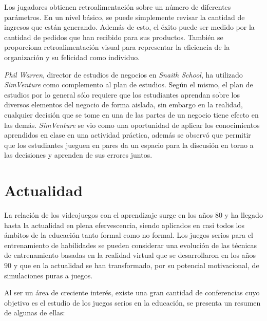 Los jugadores obtienen retroalimentación sobre un número de diferentes
parámetros. En un nivel básico, se puede simplemente revisar la cantidad de
ingresos que están generando. Además de esto, el éxito puede ser medido por la
cantidad de pedidos que han recibido para sus productos. También se proporciona
retroalimentación visual para representar la eficiencia de la organización y su
felicidad como individuo.

\emph{Phil Warren}, director de estudios de negocios en \emph{Snaith School}, ha
utilizado \emph{SimVenture} como complemento al plan de estudios. Según el
mismo, el plan de estudios por lo general sólo requiere que los estudiantes
aprendan sobre los diversos elementos del negocio de forma aislada, sin embargo
en la realidad, cualquier decisión que se tome en una de las partes de un
negocio tiene efecto en las demás. \emph{SimVenture} se vio como una oportunidad
de aplicar los conocimientos aprendidos en clase en una actividad práctica,
además se observó que permitir que los estudiantes jueguen en pares da un
espacio para la discusión en torno a las decisiones y aprenden de sus errores
juntos\cite{education:games}.

\section{Actualidad}

La relación de los videojuegos con el aprendizaje surge en los años $80$ y ha llegado
hasta la actualidad en plena efervescencia, siendo aplicados en casi todos los
ámbitos de la educación tanto formal como no formal. Los juegos serios para el
entrenamiento de habilidades se pueden considerar una evolución de las técnicas
de entrenamiento basadas en la realidad virtual que se desarrollaron en los años
$90$ y que en la actualidad se han transformado, por su potencial motivacional,
de simulaciones puras a juegos\cite{videojuegos:gonzaleztardon}.

Al ser un área de creciente interés, existe una gran cantidad de conferencias
cuyo objetivo es el estudio de los juegos serios en la educación, se presenta un
resumen de algunas de ellas:

